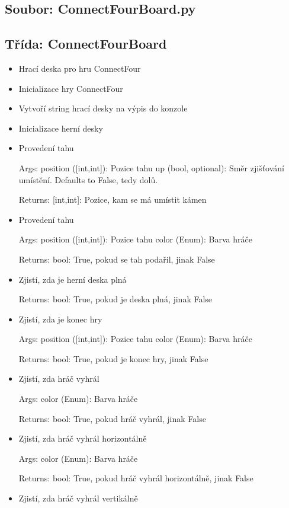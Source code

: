 \documentclass{article}
\begin{document}
\subsection*{Soubor: ConnectFourBoard.py}
\begin{itemize}
 \subsection*{Třída: ConnectFourBoard}
\begin{itemize}
\item{Hrací deska pro hru ConnectFour 
    }
\item{Inicializace hry ConnectFour
        }
\item{Vytvoří string hrací desky na výpis do konzole
        }
\item{Inicializace herní desky
        }
\item{Provedení tahu

Args:
    position ([int,int]): Pozice tahu
    up (bool, optional): Směr zjišťování umístění. Defaults to False, tedy dolů.
    
Returns:
    [int,int]: Pozice, kam se má umístit kámen            }
\item{Provedení tahu

Args:
    position ([int,int]): Pozice tahu
    color (Enum): Barva hráče
    
Returns:
    bool: True, pokud se tah podařil, jinak False}
\item{Zjistí, zda je herní deska plná

Returns:
    bool: True, pokud je deska plná, jinak False}
\item{Zjistí, zda je konec hry

Args:
    position ([int,int]): Pozice tahu
    color (Enum): Barva hráče
    
Returns:
    bool: True, pokud je konec hry, jinak False}
\item{Zjistí, zda hráč vyhrál

Args:
    color (Enum): Barva hráče
    
Returns:
    bool: True, pokud hráč vyhrál, jinak False}
\item{Zjistí, zda hráč vyhrál horizontálně

Args:
    color (Enum): Barva hráče
    
Returns:
    bool: True, pokud hráč vyhrál horizontálně, jinak False}
\item{Zjistí, zda hráč vyhrál vertikálně

}
\end{itemize}
\end{itemize}
\end{document}

